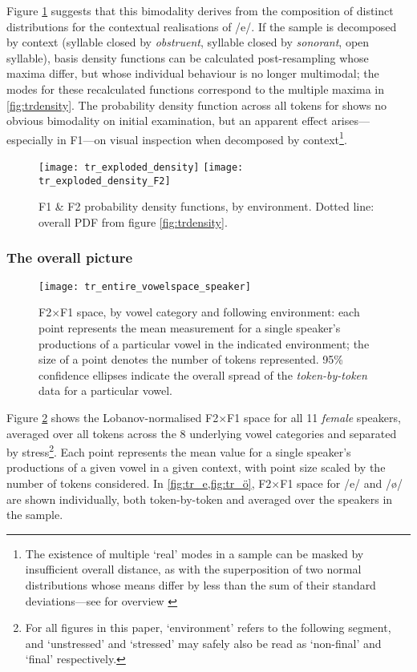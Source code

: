Figure \ref{fig:trexploded} suggests that this bimodality derives from the composition of distinct distributions for the contextual realisations of /e/. If the sample is decomposed by context (syllable closed by {\it obstruent}, syllable closed by {\it sonorant}, open syllable), basis density functions can be calculated post-resampling whose maxima differ, but whose individual behaviour is no longer multimodal; the modes for these recalculated functions correspond to the multiple maxima in \cref{fig:trdensity}. The probability density function across all tokens for \ur{\o} shows no obvious bimodality on initial examination, but an apparent effect arises---especially in F1---on visual inspection when decomposed by context\footnote{The existence of multiple `real' modes in a sample can be masked by insufficient overall distance, as with the superposition of two normal distributions whose means differ by less than the sum of their standard deviations---see for overview \citealt{Schilling2002}}.

\begin{figure}[H]
  \texttt{[image: tr\_exploded\_density]}
    \hfill
  \texttt{[image: tr\_exploded\_density\_F2]}
  \caption[F1 \& F2 probability density functions, by environment.]{F1 \& F2 probability density functions, by environment. Dotted line: overall PDF from figure \ref{fig:trdensity}.}
  \label{fig:trexploded}
\end{figure}

\subsubsection{The overall picture}

\begin{figure}[H]
  \centering
  \texttt{[image: tr\_entire\_vowelspace\_speaker]}
  \caption[F2$\times$F1 space, individual speaker means only.]{F2$\times$F1 space, by vowel category and following environment: each point represents the mean measurement for a single speaker's productions of a particular vowel in the indicated environment; the size of a point denotes the number of tokens represented. 95\% confidence ellipses indicate the overall spread of the \emph{token-by-token} data for a particular vowel.}
  \label{fig:tr_vowelspace_speaker}
\end{figure}

Figure \ref{fig:tr_vowelspace_speaker} shows the Lobanov-normalised F2$\times$F1 space for all 11 \emph{female} speakers, averaged over all tokens across the 8 underlying vowel categories and separated by stress\footnote{For all figures in this paper, `environment' refers to the following segment, and `unstressed' and `stressed' may safely also be read as `non-final' and `final' respectively.}. Each point represents the mean value for a single speaker's productions of a given vowel in a given context, with point size scaled by the number of tokens considered. In \cref{fig:tr_e,fig:tr_ö}, F2$\times$F1 space for /e/ and /\o/ are shown individually, both token-by-token and averaged over the speakers in the sample.

